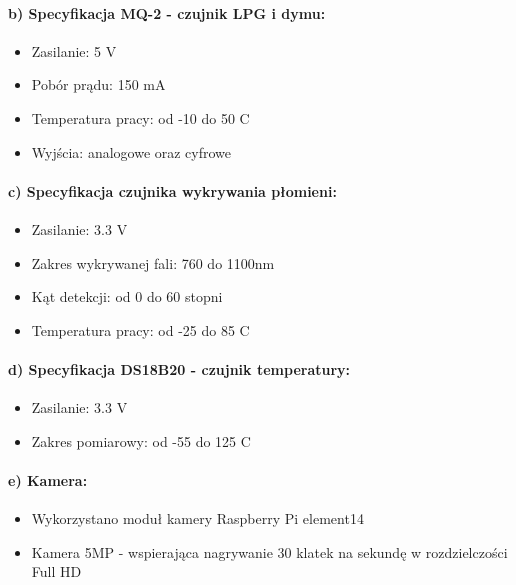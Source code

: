 \paragraph{b) Specyfikacja MQ-2 - czujnik LPG i dymu:}
\begin{itemize} 
\item Zasilanie: 5 V
\item Pobór prądu: 150 mA
\item Temperatura pracy: od -10 do 50 \textdegree{}C
\item Wyjścia: analogowe oraz cyfrowe
\end{itemize}
\paragraph{c) Specyfikacja czujnika wykrywania płomieni:}
\begin{itemize} 
\item Zasilanie: 3.3 V
\item Zakres wykrywanej fali: 760 do 1100nm
\item Kąt detekcji: od 0 do 60 stopni
\item Temperatura pracy: od -25 do 85 \textdegree{}C
\end{itemize}
\paragraph{d) Specyfikacja DS18B20 - czujnik temperatury:}
\begin{itemize} 
\item Zasilanie: 3.3 V
\item Zakres pomiarowy: od -55 do 125 \textdegree{}C
\end{itemize}
\paragraph{e) Kamera:}
\begin{itemize} 
\item Wykorzystano moduł kamery Raspberry Pi element14
\item Kamera 5MP - wspierająca nagrywanie 30 klatek na sekundę w rozdzielczości Full HD
\end{itemize}
